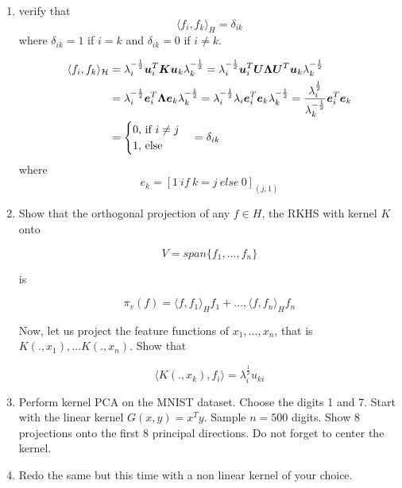 \documentclass{article}
\begin{document}
\begin{enumerate}

    \item verify that \[\langle f_i,f_k \rangle_H=\delta_{ik}\]
    where $\delta_{ik}=1$ if $i=k$ and $\delta_{ik}=0$ if $i \not = k$. 

    \begin{equation} 
        \begin{aligned}
            \langle f_i, f_k \rangle_{\mathcal{H}} &= \lambda^{-\frac{1}{2}}_i \bm{u}_i^T\bm{K}\bm{u}_k \lambda_k^{-\frac{1}{2}} \notag 
            = \lambda^{-\frac{1}{2}}_i \bm{u}_i^T\bm{U \Lambda U}^T\bm{u}_k \lambda_k^{-\frac{1}{2}} \\
            &= \lambda^{-\frac{1}{2}}_i \bm{e}_i^T\bm{\Lambda}\bm{e}_k \lambda_k^{-\frac{1}{2}} 
            = \lambda^{-\frac{1}{2}}_i \lambda_i\bm{e}_i^T\bm{e}_k \lambda_k^{-\frac{1}{2}} 
            = \frac{\lambda^{\frac{1}{2}}_i}{\lambda_k^{-\frac{1}{2}}} \bm{e}_i^T\bm{e}_k \\
            &= 
                \begin{cases} 
                    0 \mbox{, if $i \ne j$} \\
                    1 \mbox{, else}
                \end{cases} 
            = \delta_{ik}
        \end{aligned}
    \end{equation}
    where \[e_k = [1\ if\ k=j\ else\ 0]_{(j,1)}\]
    
    \item Show that the orthogonal projection of any $f \in H$, the RKHS with kernel $K$ onto 
        
        \[V=span\{f_1,\ldots,f_n\}\]

        is

        \[\pi_v(f)=\langle f,f_1\rangle_H f_1+\ldots,\langle f,f_n\rangle_H f_n\]

        Now, let us project the feature functions of $x_1,\ldots,x_n$, that is $K(.,x_1), \ldots K(.,x_n)$. Show that 

        \[\langle K(.,x_k),f_i \rangle = \lambda_i^\frac{1}{2} u_{ki}\]
    
    \item Perform kernel PCA on the MNIST dataset. Choose the digits 1 and 7. 
    Start with the linear kernel $G(x,y)=x^Ty$. Sample $n=500$ digits. Show 8 
    projections onto the first 8 principal directions. Do not forget to center the 
    kernel. 


    \item Redo the same but this time with a non linear kernel of your choice.  
    
    

\end{enumerate}
\end{document}
